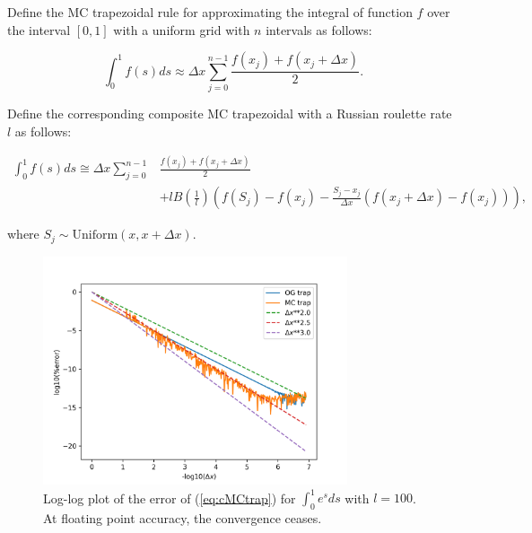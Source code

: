 \documentclass[a4paper,12pt]{article}
\begin{document}
\begin{definition} \label{MCtrap}
    Define the MC trapezoidal rule for approximating the integral
    of function $f$ over the interval $[0, 1]$ with a uniform grid
    with $n$ intervals as follows:

    \begin{equation}
        \int_{0}^{1} f(s) ds \approx \Delta x \sum_{j=0}^{n-1}  \frac{f(x_{j}) + f(x_{j}+\Delta x)}{2} .
    \end{equation}

    Define the  corresponding composite MC trapezoidal
    with a Russian roulette rate $l$ as follows:

    \begin{align} \label{eq:cMCtrap}
        \int_{0}^{1} f(s) ds \cong \Delta x \sum_{j=0}^{n-1} & \frac{f(x_{j}) + f(x_{j}+\Delta x)}{2} \nonumber \\
                                                             & + l B\left(\frac{1}{l}\right)
        \left(f(S_j) - f(x_{j}) - \frac{S_j - x_{j}}{\Delta x}(f(x_{j}+\Delta x) - f(x_{j}))\right),
    \end{align}


    where $S_j \sim \text{Uniform}(x,x+\Delta x)$.

\end{definition}



\begin{figure}[h!]
    \centering
    \includegraphics[width=0.8\textwidth]{plots/MCtrap.png}
    \caption{Log-log plot of the error of (\ref{eq:cMCtrap}) for
    $\int_{0}^{1}e^{s}ds$ with $l=100$. At floating point accuracy,
    the convergence ceases.
    }
    \label{fig:MCtrap}
\end{figure}
\end{document}
